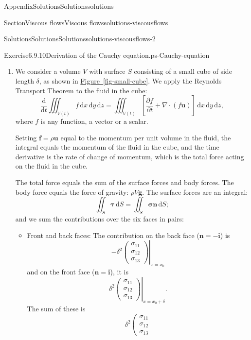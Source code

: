\documentclass[oneside,10pt,]{book}
\newcommand{\xreffont}{\relax}
\newcommand{\ptxlistdisc}{\raisebox{0.3ex}{\textbullet}}
\numberwithin{equation}{section}
\newcommand{\de}{\mathrm{d}}
\newcommand{\dd}[2]{\frac{\de#1}{\de#2}}
\newcommand{\pd}[2]{\frac{\partial#1}{\partial#2}}
\newcommand{\bn}{\boldsymbol{n}}
\newcommand{\bu}{\boldsymbol{u}}
\renewcommand{\bf}{\boldsymbol{f}}
\newcommand{\bg}{\boldsymbol{g}}
\newcommand{\bsigma}{\boldsymbol{\sigma}}
\newcommand{\btau}{\boldsymbol{\tau}}
\newcommand{\bi}{\boldsymbol{i}}
\begin{document}
\begin{appendixptx}{Appendix}{Solutions}{}{Solutions}{}{}{solutions}
\begin{sectionptx}{Section}{Viscous flows}{}{Viscous flows}{}{}{solutions-viscousflows}
\begin{solutions-subsection-numberless}{Solutions}{Solutions}{}{Solutions}{}{}{solutions-viscousflows-2}
\begin{divisionsolution}{Exercise}{6.9.10}{Derivation of the Cauchy equation.}{ps-Cauchy-equation}
\begin{enumerate}[font=\bfseries,label=(\alph*),ref=\alph*]
\item[(a)]\noindent\hypertarget{ps-Cauchy-equation-3-2-main}{}We consider a volume \(V\) with surface \(S\) consisting of a small cube of side length \(\delta\), as shown in \hyperref[fig-small-cube]{Figure~{\xreffont\ref{fig-small-cube}}}. We apply the Reynolds Transport Theorem to the fluid in the cube:%
\begin{equation*}
\dd{}{t} \iiint_{V(t)} f \, \de{x} \, \de{y} \, \de{z} = \iiint_{V(t)} \left[
\pd{f}{t} + \nabla \cdot (f\bu)\right] \, \de{x} \, \de{y} \, \de{z},
\end{equation*}
where \(f\) is any function, a vector or a scalar.%
\par
Setting \(\bf=\rho\bu\) equal to the momentum per unit volume in the fluid, the integral equals the momentum of the fluid in the cube, and the time derivative is the rate of change of momentum, which is the total force acting on the fluid in the cube.%
\par
The total force equals the sum of the surface forces and body forces. The body force equals the force of gravity: \(\rho V\bg\). The surface forces are an integral:%
\begin{equation*}
\iint_S\btau\,\de S=\iint_S\bsigma\bn\,\de S;
\end{equation*}
and we sum the contributions over the six faces in pairs:%
\begin{itemize}[label=\ptxlistdisc]
\item{}Front and back faces: The contribution on the back face (\(\bn=-\bi\)) is%
\begin{equation*}
-\delta^2\left.\left(\begin{array}{c}
\sigma_{11}\\\sigma_{12}\\\sigma_{13}
\end{array}\right)\right|_{x=x_0}
\end{equation*}
and on the front face (\(\bn=\bi\)), it is%
\begin{equation*}
\delta^2\left.\left(\begin{array}{c}
\sigma_{11}\\\sigma_{12}\\\sigma_{13}
\end{array}\right)\right|_{x=x_0+\delta}.
\end{equation*}
The sum of these is%
\begin{equation*}
\delta^2\left.\left(\begin{array}{c}
\sigma_{11}\\\sigma_{12}\\\sigma_{13}

\end{array}
\end{equation*}
\end{itemize}
\end{enumerate}
\end{divisionsolution}
\end{solutions-subsection-numberless}
\end{sectionptx}
\end{appendixptx}
\end{document}
